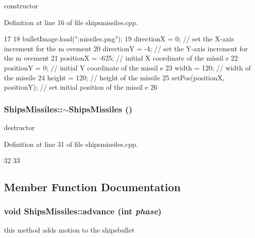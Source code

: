 constructor 

Definition at line 16 of file shipsmissiles.cpp.


\begin{DoxyCode}
17 {   
18     bulletImage.load(":missiles.png");
19     directionX = 0;                         // set the X-axis increment for the m
      ovement
20     directionY = -4;                        // set the Y-axis increment for the m
      ovement
21     positionX = -625;                       // initial X coordinate of the missil
      e
22     positionY = 0;                          // initial Y coordinate of the missil
      e
23     width = 120;                             // width of the missile
24     height = 120;                            // height of the missile
25     setPos(positionX, positionY);           // set initial position of the missil
      e
26 }
\end{DoxyCode}
\hypertarget{class_ships_missiles_aff6a5eeef72231cedebb37c1f90e7e36}{
\subsubsection[{$\sim$ShipsMissiles}]{\setlength{\rightskip}{0pt plus 5cm}ShipsMissiles::$\sim$ShipsMissiles ()}}
\label{class_ships_missiles_aff6a5eeef72231cedebb37c1f90e7e36}
destructor 

Definition at line 31 of file shipsmissiles.cpp.


\begin{DoxyCode}
32 {
33 }
\end{DoxyCode}


\subsection{Member Function Documentation}
\hypertarget{class_ships_missiles_a5ce92a82b6f1259319e92379ab4ee306}{
\subsubsection[{advance}]{\setlength{\rightskip}{0pt plus 5cm}void ShipsMissiles::advance (int {\em phase})}}
\label{class_ships_missiles_a5ce92a82b6f1259319e92379ab4ee306}
this method adds motion to the shipsbullet 

